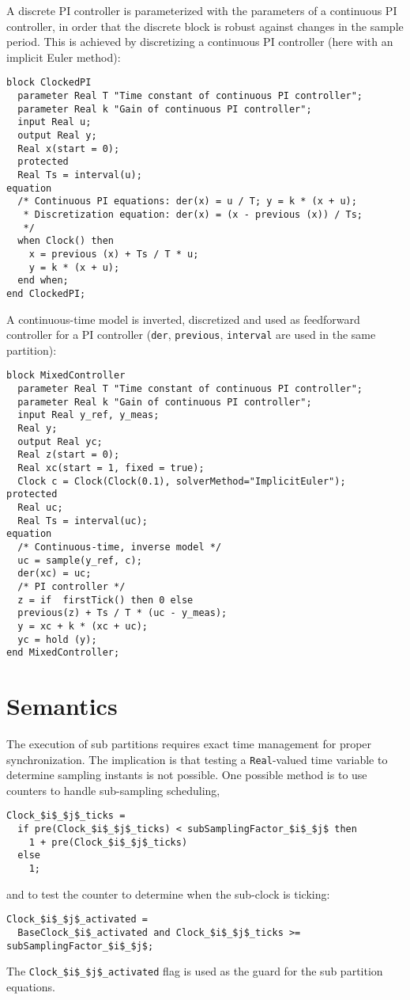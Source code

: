 \begin{example}
A discrete PI controller is parameterized with the parameters of a continuous PI controller, in order that the discrete block is robust against changes in the sample period.
This is achieved by discretizing a continuous PI controller (here with an implicit Euler method):
\begin{lstlisting}[language=modelica]
block ClockedPI
  parameter Real T "Time constant of continuous PI controller";
  parameter Real k "Gain of continuous PI controller";
  input Real u;
  output Real y;
  Real x(start = 0);
  protected
  Real Ts = interval(u);
equation
  /* Continuous PI equations: der(x) = u / T; y = k * (x + u);
   * Discretization equation: der(x) = (x - previous (x)) / Ts;
   */
  when Clock() then
    x = previous (x) + Ts / T * u;
    y = k * (x + u);
  end when;
end ClockedPI;
\end{lstlisting}
A continuous-time model is inverted, discretized and used as feedforward controller for a PI controller (\lstinline!der!, \lstinline!previous!, \lstinline!interval! are used in the same partition):
\begin{lstlisting}[language=modelica]
block MixedController
  parameter Real T "Time constant of continuous PI controller";
  parameter Real k "Gain of continuous PI controller";
  input Real y_ref, y_meas;
  Real y;
  output Real yc;
  Real z(start = 0);
  Real xc(start = 1, fixed = true);
  Clock c = Clock(Clock(0.1), solverMethod="ImplicitEuler");
protected
  Real uc;
  Real Ts = interval(uc);
equation
  /* Continuous-time, inverse model */
  uc = sample(y_ref, c);
  der(xc) = uc;
  /* PI controller */
  z = if  firstTick() then 0 else
  previous(z) + Ts / T * (uc - y_meas);
  y = xc + k * (xc + uc);
  yc = hold (y);
end MixedController;
\end{lstlisting}
\end{example}

\section{Semantics}\label{semantics}

The execution of sub partitions requires exact time management for proper synchronization.
The implication is that testing a \lstinline!Real!-valued time variable to determine sampling instants is not possible.
One possible method is to use counters to handle sub-sampling scheduling,
\begin{lstlisting}[language=modelica]
Clock_$i$_$j$_ticks =
  if pre(Clock_$i$_$j$_ticks) < subSamplingFactor_$i$_$j$ then
    1 + pre(Clock_$i$_$j$_ticks)
  else
    1;
\end{lstlisting}
and to test the counter to determine when the sub-clock is ticking:
\begin{lstlisting}[language=modelica]
Clock_$i$_$j$_activated =
  BaseClock_$i$_activated and Clock_$i$_$j$_ticks >= subSamplingFactor_$i$_$j$;
\end{lstlisting}
The \lstinline!Clock_$i$_$j$_activated! flag is used as the guard for the sub
partition equations.

